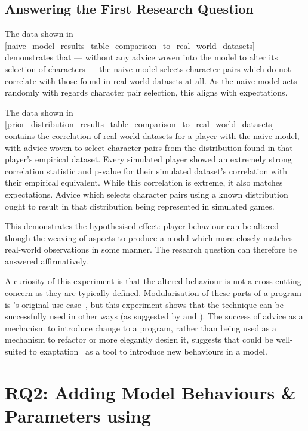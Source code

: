 \subsection{Answering the First Research Question}

The data shown in
\cref{naive_model_results_table_comparison_to_real_world_datasets} demonstrates
that --- without any advice woven into the model to alter its selection of
characters --- the naive model selects character pairs which do not correlate
with those found in real-world datasets at all. As the naive model acts randomly
with regards character pair selection, this aligns with expectations.

The data shown in
\cref{prior_distribution_results_table_comparison_to_real_world_datasets}
contains the correlation of real-world datasets for a player with the naive
model, with advice woven to select character pairs from the distribution found
in that player's empirical dataset. Every simulated player showed an
extremely strong correlation statistic and p-value for their simulated dataset's
correlation with their empirical equivalent. While this correlation is extreme,
it also matches expectations. Advice which selects character pairs using a known
distribution ought to result in that distribution being represented in
simulated games.

This demonstrates the hypothesised effect: player behaviour can be altered
though the weaving of aspects to produce a model which more closely matches
real-world observations in some manner. The research question can therefore be
answered affirmatively.

A curiosity of this experiment is that the altered behaviour is not a
cross-cutting concern as they are typically defined. Modularisation of these
parts of a program is \aop{}'s original use-case~\cite{kiczales1997aspect}, but
this experiment shows that the technique can be successfully used in other ways
(as suggested by \citet{gulyas1999use} and \citet{steimann06paradoxical}). The
success of advice as a mechanism to introduce change to a program, rather than
being used as a mechanism to refactor or more elegantly design it, suggests that
\aop{} could be well-suited to exaptation~\cite{exaptation_origin} as a tool to
introduce new behaviours in a model.



\section{RQ2: Adding Model Behaviours \& Parameters using \AspectOrientation}
\label{sec:rq3}

